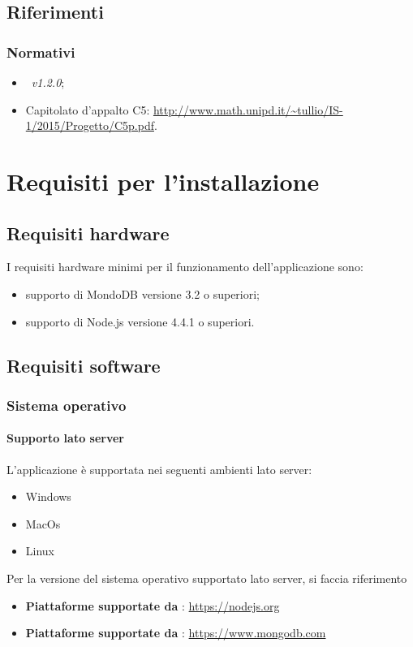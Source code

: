 \documentclass[12pt,a4paper]{article}
\begin{document}
	\subsection{Riferimenti}
	
\subsubsection{Normativi}
\begin{itemize}
	\item \NdP\ \textit{v1.2.0};
	\item Capitolato d'appalto C5: \url{http://www.math.unipd.it/~tullio/IS-1/2015/Progetto/C5p.pdf}.
\end{itemize}	
	

	
	\newpage
	\section{Requisiti per l'installazione}\label{requisiti}
	\subsection{Requisiti hardware}\label{requisitiHW}
	I requisiti hardware minimi per il funzionamento dell'applicazione sono:
	\begin{itemize}
		\item supporto di MondoDB versione 3.2 o superiori;
		\item supporto di Node.js versione 4.4.1 o superiori.
	\end{itemize}
	\subsection{Requisiti software}\label{requisitiSW}
	\subsubsection{Sistema operativo}
	\paragraph{Supporto lato server}L'applicazione \prj{} è supportata nei seguenti ambienti lato server:
	\begin{itemize}
		\item Windows 
		\item MacOs
		\item Linux
	\end{itemize}
	Per la versione del sistema operativo supportato lato server, si faccia riferimento 
	\begin{itemize}
		\item \textbf{Piattaforme supportate da }: \url{https://nodejs.org}  
		\item \textbf{Piattaforme supportate da }: \url{https://www.mongodb.com}
	\end{itemize}
\end{document}

